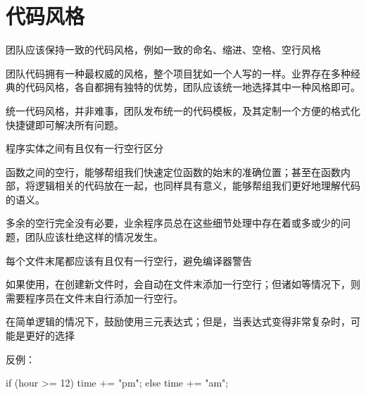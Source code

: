 \section{代码风格}

\begin{content}

\begin{regulation}
团队应该保持一致的代码风格，例如一致的命名、缩进、空格、空行风格
\end{regulation}

团队代码拥有一种最权威的风格，整个项目犹如一个人写的一样。业界存在多种经典的代码风格，各自都拥有独特的优势，团队应该统一地选择其中一种风格即可。

\begin{enum}
\end{enum}

统一代码风格，并非难事，团队发布统一的代码模板，及其定制一个方便的格式化快捷键即可解决所有问题。

\begin{regulation}
程序实体之间有且仅有一行空行区分
\end{regulation}

函数之间的空行，能够帮组我们快速定位函数的始末的准确位置；甚至在函数内部，将逻辑相关的代码放在一起，也同样具有意义，能够帮组我们更好地理解代码的语义。

多余的空行完全没有必要，业余程序员总在这些细节处理中存在着或多或少的问题，团队应该杜绝这样的情况发生。

\begin{regulation}
每个文件末尾都应该有且仅有一行空行，避免编译器警告
\end{regulation}

如果使用，在创建新文件时，会自动在文件末添加一行空行；但诸如等情况下，则需要程序员在文件末自行添加一行空行。

\begin{regulation}
在简单逻辑的情况下，鼓励使用三元表达式；但是，当表达式变得非常复杂时，可能是更好的选择
\end{regulation}

反例：
\begin{leftbar}
\begin{c++}
if (hour >= 12) 
{
    time += "pm";
} 
else 
{
    time += "am";
}
\end{c++}
\end{leftbar}


\end{content}
